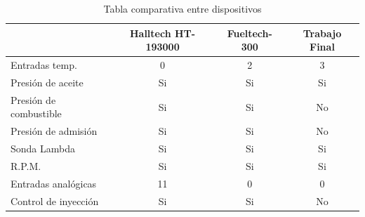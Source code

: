 \vspace{25px}

\begin{table}[h]
	\centering
	\caption[caption corto]{Tabla comparativa entre dispositivos}
	\begin{tabular}{l c c c}    
		\toprule
		\textbf{ }     & \textbf{Halltech HT-193000} & \textbf{Fueltech-300} & \textbf{Trabajo Final}\\
		\midrule
		Entradas temp.			&  0 &   2 &  3\\
		Presión de aceite		& Si &  Si & Si\\
		Presión de combustible	& Si &  Si & No\\
		Presión de admisión		& Si &  Si & No\\
		Sonda Lambda			& Si &  Si & Si\\
		R.P.M.					& Si &  Si & Si\\
		Entradas analógicas		& 11 &  0  &  0\\
		Control de inyección	& Si &  Si & No\\
		\bottomrule
		\hline
	\end{tabular}
	\label{tab:comparativa}
\end{table}


